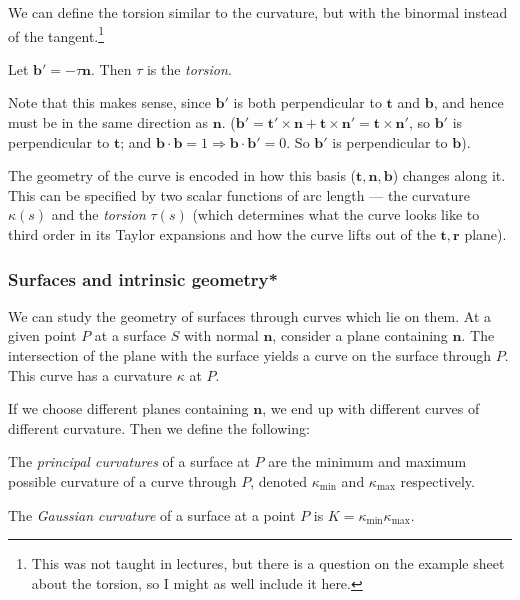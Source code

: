\documentclass[a4paper]{article}
\begin{document}
We can define the torsion similar to the curvature, but with the binormal instead of the tangent.\footnote{This was not taught in lectures, but there is a question on the example sheet about the torsion, so I might as well include it here.}

\begin{defi}[Torsion] Let $\mathbf{b}' = -\tau \mathbf{n}$. Then $\tau$ is the \emph{torsion}.
\end{defi}
Note that this makes sense, since $\mathbf{b}'$ is both perpendicular to $\mathbf{t}$ and $\mathbf{b}$, and hence must be in the same direction as $\mathbf{n}$. ($\mathbf{b}' = \mathbf{t}'\times \mathbf{n} + \mathbf{t}\times \mathbf{n}' = \mathbf{t}\times \mathbf{n}'$, so $\mathbf{b}'$ is perpendicular to $\mathbf{t}$; and $\mathbf{b} \cdot \mathbf{b} = 1\Rightarrow \mathbf{b}\cdot \mathbf{b}' = 0$. So $\mathbf{b}'$ is perpendicular to $\mathbf{b}$).

The geometry of the curve is encoded in how this basis ($\mathbf{t}, \mathbf{n}, \mathbf{b}$) changes along it. This can be specified by two scalar functions of arc length --- the curvature $\kappa(s)$ and the \emph{torsion} $\tau(s)$ (which determines what the curve looks like to third order in its Taylor expansions and how the curve lifts out of the $\mathbf{t}, \mathbf{r}$ plane).

\subsubsection*{Surfaces and intrinsic geometry*}
We can study the geometry of surfaces through curves which lie on them. At a given point $P$ at a surface $S$ with normal $\mathbf{n}$, consider a plane containing $\mathbf{n}$. The intersection of the plane with the surface yields a curve on the surface through $P$. This curve has a curvature $\kappa$ at $P$.

If we choose different planes containing $\mathbf{n}$, we end up with different curves of different curvature. Then we define the following:
\begin{defi}
  The \emph{principal curvatures} of a surface at $P$ are the minimum and maximum possible curvature of a curve through $P$, denoted $\kappa_{\min}$ and $\kappa_{\max}$ respectively.
\end{defi}

\begin{defi}
  The \emph{Gaussian curvature} of a surface at a point $P$ is $K = \kappa_{\min}\kappa_{\max}$.
\end{defi}
\end{document}
